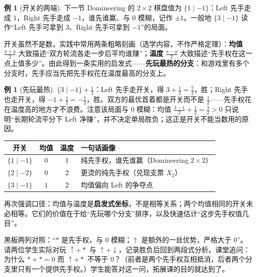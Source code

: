 \documentclass[UTF8,a4paper,11pt,oneside,openany,fontset=fandol]{ctexbook}
\theoremstyle{definition}
\newtheorem{example}[definition]{例}
\begin{document}
\begin{example}[开关的两端]\label{ex:switch}
下一节 Domineering 的 $2\times2$ 棋盘值为 $\{1\mid -1\}$：Left 先手走成 $1$，Right 先手走成 $-1$，谁先谁赢、与 $0$ 模糊，记作 $\pm1$。一般地 $\{3\mid -1\}$ 读作“Left 先手可拿到 $3$、Right 先手可拿到 $-1$”的局面。
\end{example}

开关虽然不是数，实践中常用两条粗略刻画（选学内容，不作严格定理）：\textbf{均值} $\tfrac{x+y}{2}$ 大致描述“双方轮流各走一步后平均谁赚”；\textbf{温度} $\tfrac{x-y}{2}$ 大致描述“先手权在这一点上值多少”。由此得到一条实用的启发式——\textbf{先玩最热的分支}：和游戏里有多个分支时，先手应当先把先手权花在温度最高的分支上。

\begin{example}[先玩最热]\label{ex:hotstrat}
$\{3\mid -1\}+\tfrac12$：Left 先手走开关，得 $3+\tfrac12=\tfrac72$，胜；Right 先手也走开关，得 $-1+\tfrac12=-\tfrac12$，胜。双方的最优首着都是开关而不是 $\tfrac12$——先手权花在温度高的地方才不浪费。注意该局面与 $0$ 模糊：均值 $\tfrac{3-1}{2}+ \tfrac12=\tfrac32>0$ 只说明“长期轮流平分下 Left 净赚”，并不决定单局胜负；这正是开关不能当数用的原因。
\end{example}

\begin{center}
\begin{tabular}{cccl}
\toprule
开关 & 均值 & 温度 & 一句话画像\\
\midrule
$\{1\mid -1\}$ & $0$ & $1$ & 纯先手权，谁先谁赢（Domineering $2\times2$）\\
$\{2\mid -2\}$ & $0$ & $2$ & 更烫的纯先手权（兑现支票 $X_2$）\\
$\{3\mid -1\}$ & $1$ & $2$ & 均值偏向 Left 的争夺点\\
\bottomrule
\end{tabular}
\end{center}

再次强调口径：均值与温度是\textbf{启发式坐标}，不是相等关系；两个均值相同的开关未必相等。它们的价值在于给“先玩哪个分支”排序，以及快速估计“这步先手权值几目”。

\begin{teach}[微小值的课堂演示]
黑板两列对照：“$\ast$ 是先手权，与 $0$ 模糊；$\uparrow$ 是额外的一丝优势，严格大于 $0$”。请两位学生实际对玩 $\uparrow+\ast$ 与 $\uparrow+\downarrow$，记录胜负后回到两段式分析。课堂追问：为什么 $\ast+\ast=0$ 而 $\uparrow+\ast$ 不等于 $0$？（前者是两个先手权互相抵消，后者两个分支里只有一个提供先手权。）学生能答对这一问，拓展课的目的就达到了。
\end{teach}
\end{document}
